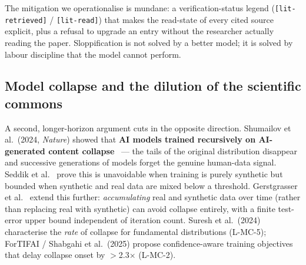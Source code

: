 \documentclass[11pt,a4paper]{article}
\begin{document}
The mitigation we operationalise is mundane: a verification-status
legend (\texttt{[lit-retrieved]} / \texttt{[lit-read]}) that makes the
read-state of every cited source explicit, plus a refusal to upgrade an
entry without the researcher actually reading the paper.
Sloppification is not solved by a better model; it is solved by labour
discipline that the model cannot perform.

\subsection{Model collapse and the dilution of the scientific commons}
\label{sec:disc-model-collapse}
A second, longer-horizon argument cuts in the opposite direction.
Shumailov et al.\ (2024, \emph{Nature}) showed that \textbf{AI models
trained recursively on AI-generated content
collapse}~\citep{shumailov2024modelcollapse} --- the tails of the
original distribution disappear and successive generations of models
forget the genuine human-data signal. Seddik et
al.~\citep{seddik2024collapse} prove this is unavoidable when training
is purely synthetic but bounded when synthetic and real data are mixed
below a threshold. Gerstgrasser et
al.~\citep{gerstgrasser2024accumulate} extend this further:
\emph{accumulating} real and synthetic data over time (rather than
replacing real with synthetic) can avoid collapse entirely, with a
finite test-error upper bound independent of iteration count.
Suresh et al.\ (2024) characterise the \emph{rate} of collapse for
fundamental distributions (L-MC-5); ForTIFAI / Shabgahi et al.\ (2025)
propose confidence-aware training objectives that delay collapse onset
by $>$2.3$\times$ (L-MC-2).
\end{document}
